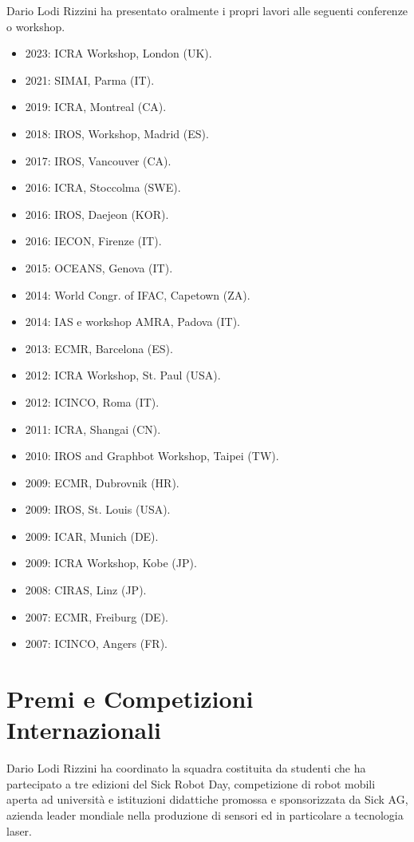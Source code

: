 \documentclass[11pt]{article}
\begin{document}
\begin{itemize}
Dario Lodi Rizzini ha presentato oralmente i propri lavori alle seguenti conferenze o workshop.
\begin{itemize}
\item 2023: ICRA Workshop, London (UK). 
\item 2021: SIMAI, Parma (IT). 
\item 2019: ICRA, Montreal (CA).
\item 2018: IROS, Workshop, Madrid (ES).
\item 2017: IROS, Vancouver (CA).
\item 2016: ICRA, Stoccolma (SWE).
\item 2016: IROS, Daejeon (KOR).
\item 2016: IECON, Firenze (IT).
\item 2015: OCEANS, Genova (IT).
\item 2014: World Congr. of IFAC, Capetown (ZA).
\item 2014: IAS e workshop AMRA, Padova (IT).
\item 2013: ECMR, Barcelona (ES). 
\item 2012: ICRA Workshop, St. Paul (USA). 
\item 2012: ICINCO, Roma (IT). 
\item 2011: ICRA, Shangai (CN). 
\item 2010: IROS and Graphbot Workshop, Taipei (TW).
\item 2009: ECMR, Dubrovnik (HR).
\item 2009: IROS, St. Louis (USA).
\item 2009: ICAR, Munich (DE).
\item 2009: ICRA Workshop, Kobe (JP).
\item 2008: CIRAS, Linz (JP).
\item 2007: ECMR, Freiburg (DE).
\item 2007: ICINCO, Angers (FR).
\end{itemize}


\section*{Premi e Competizioni Internazionali}

Dario Lodi Rizzini ha coordinato la squadra costituita da studenti che ha partecipato a tre edizioni del Sick Robot Day,
competizione di robot mobili aperta ad universit\`a e istituzioni didattiche promossa e sponsorizzata 
da Sick AG, azienda leader mondiale nella produzione di sensori ed in particolare a tecnologia laser. 


\end{itemize}
\end{document}
